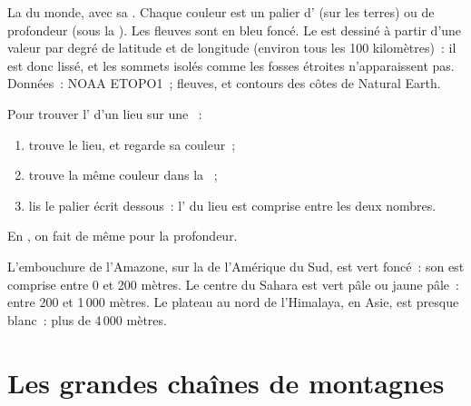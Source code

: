 \begin{omfigure}
{\small La  du monde, avec sa . Chaque couleur est un
palier d' (sur les terres) ou de profondeur (sous la ). Les
fleuves sont en bleu foncé. Le  est dessiné à partir d'une valeur par
degré de latitude et de longitude (environ tous les 100 kilomètres)~: il
est donc lissé, et les sommets isolés comme les fosses étroites
n'apparaissent pas. Données~:  NOAA ETOPO1~; fleuves,  et
contours des côtes de Natural Earth.}
\label{fig:g4:world-physical-map:map}
\end{omfigure}

\begin{method}\label{met:g4:world-physical-map:reading}
Pour trouver l' d'un lieu sur une ~:
\begin{enumerate}
  \item trouve le lieu, et regarde sa couleur~;
  \item trouve la même couleur dans la ~;
  \item lis le palier écrit dessous~: l' du lieu est comprise entre
        les deux nombres.
\end{enumerate}
En , on fait de même pour la profondeur.
\end{method}

\begin{example}\label{ex:g4:world-physical-map:three}
L'embouchure de l'Amazone, sur la  de l'Amérique du Sud, est vert
foncé~: son  est comprise entre 0 et 200 mètres. Le centre du
Sahara est vert pâle ou jaune pâle~: entre 200 et 1\,000 mètres. Le plateau
au nord de l'Himalaya, en Asie, est presque blanc~: plus de 4\,000 mètres.
\end{example}

\section{Les grandes chaînes de montagnes}

